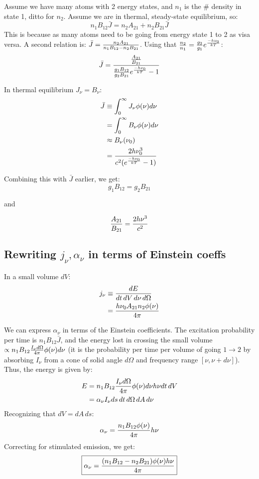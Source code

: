 \documentclass[11pt]{article}
\def\_{\bar}
\def\ato{{A_{21}}}
\def\bto{{B_{21}}}
\def\bot{{B_{12}}}
\begin{document}
Assume we have many atoms with 2 energy states, and $n_1$ is the \# density
in state 1, ditto for $n_2$.  Assume we are in thermal, steady-state 
equilibrium, so:
$$n_1\bot\_J=n_2\ato+n_2\bto\_J$$
This is because as many atoms need to be
going from energy state 1 to 2 as visa versa.
A second relation is:
$\_J = {n_2\ato\over n_1\bot-n_2\bto}$.
Using that ${n_2\over n_1}={g_2\over g_1}e^{{-h\nu _0 \over kT}}$:
$$\_J={{\ato\over\bto}\over{g_1\bot\over g_2\bto}\eboltz-1}$$

In thermal equilibrium $J_\nu=B_\nu$:
$$\begin{aligned}\_J&\equiv\int_0^\infty{J_\nu\phi(\nu)d\nu}\\ 
&=\int_0^\infty{B_\nu\phi(\nu)d\nu}\\ 
&\approx B_\nu(\nu_0)\\ 
&={2h\nu_0^3\over c^2(\eboltz-1)}\\ \end{aligned}$$

Combining this with $\_J$ earlier, we get:
$$\boxed{g_1\bot=g_2\bto}$$
\centerline{and}
$${\ato\over\bto}={2h\nu^3\over c^2}$$

\subsection*{ Rewriting $j_\nu, \alpha_\nu $ in terms of Einstein coeffs}

In a small volume $dV$:
$$\begin{aligned}j_\nu&\equiv{dE\over dt\,dV\,d\nu\,d\Omega}\\ 
&={h\nu_0\ato n_2\phi(\nu)\over4\pi}\\ \end{aligned}$$

We can express $\alpha_\nu$ in terms of the Einstein coefficients.  The
excitation probability per time is $n_1B_{12}\_J$, and
the energy lost in crossing the small volume 
$\propto n_1\bot{I_\nu d\Omega\over4\pi}\phi(\nu)d\nu$
(it is the probability per time per volume of going $1\to2$ by absorbing 
$I_\nu$ from
a cone of solid angle $d\Omega$ and frequency range $[\nu,\nu+d\nu]$). Thus,
the energy is given by:
$$\begin{aligned}E&=n_1\bot{I_\nu d\Omega\over4\pi}\phi(\nu)d\nu h\nu dt\,dV\\ 
&=\alpha_\nu I_\nu ds\,dt\,d\Omega\,dA\,d\nu\\ \end{aligned}$$ 
Recognizing that $dV=dA\,ds$:
$$\alpha_\nu={n_1\bot\phi(\nu)\over4\pi}h\nu$$
Correcting for stimulated emission, we get:
$$\boxed{\alpha_\nu={(n_1\bot-n_2\bto)\phi(\nu)h\nu\over4\pi}}$$
\end{document}
